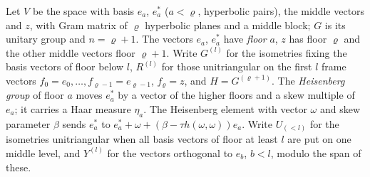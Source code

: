 Let $V$ be the space with basis $e_a$, $e^*_a$ ($a<\varrho$, hyperbolic pairs), the middle vectors and $z$, with Gram matrix of $\varrho$ hyperbolic planes and a middle block; $G$ is its unitary group and
$n=\varrho+1$. The vectors $e_a$, $e^*_a$ have \emph{floor} $a$, $z$ has floor $\varrho$ and the other middle vectors floor $\varrho+1$. Write $G^{(l)}$ for the isometries fixing the basis vectors of floor
below $l$, $R^{(l)}$ for those unitriangular on the first $l$ frame vectors $f_0=e_0,\dots,f_{\varrho-1}=e_{\varrho-1}$, $f_\varrho=z$, and $H=G^{(\varrho+1)}$. The \emph{Heisenberg group} of floor $a$ moves
$e^*_a$ by a vector of the higher floors and a skew multiple of $e_a$; it carries a Haar measure $\eta_a$. The Heisenberg element with vector $\omega$ and skew parameter $\beta$ sends $e^*_a$ to
$e^*_a+\omega+(\beta-\tau h(\omega,\omega))e_a$. Write $U_{(<l)}$ for the isometries unitriangular when all basis vectors of floor at least $l$ are put on one middle level, and $Y^{(l)}$ for the vectors orthogonal to
$e_b$, $b<l$, modulo the span of these.

